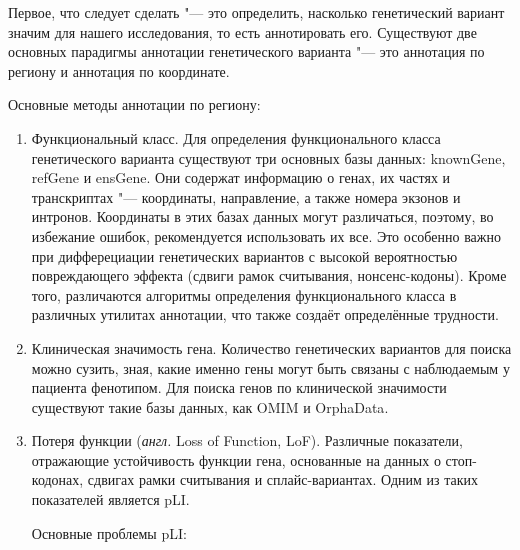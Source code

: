 \documentclass[a4paper,12pt]{article}
\begin{document}
Первое, что следует сделать "--- это определить, насколько генетический вариант значим для нашего исследования, то есть аннотировать его.
Существуют две основных парадигмы аннотации генетического варианта "--- это аннотация по региону и аннотация по координате.

Основные методы аннотации по региону:

\begin{enumerate}
\item Функциональный класс.
Для определения функционального класса генетического варианта существуют три основных базы данных: knownGene, refGene и ensGene.
Они содержат информацию о генах, их частях и транскриптах "--- координаты, направление, а также номера экзонов и интронов.
Координаты в этих базах данных могут различаться\cite{McCarthy_2014}, поэтому, во избежание ошибок, рекомендуется использовать их все.
Это особенно важно при дифферециации генетических вариантов с высокой вероятностью повреждающего эффекта (сдвиги рамок считывания, нонсенс-кодоны).
Кроме того, различаются алгоритмы определения функционального класса в различных утилитах аннотации, что также создаёт определённые трудности\cite{Jesaitis_2014}.

\item Клиническая значимость гена.
Количество генетических вариантов для поиска можно сузить, зная, какие именно гены могут быть связаны с наблюдаемым у пациента фенотипом.
Для поиска генов по клинической значимости существуют такие базы данных, как OMIM\cite{Amberger_2014} и OrphaData\cite{Orphanet}.

\item Потеря функции (\textit{англ.} Loss of Function, LoF).
Различные показатели, отражающие устойчивость функции гена, основанные на данных о стоп-кодонах, сдвигах рамки считывания и сплайс-вариантах.
Одним из таких показателей является pLI.

Основные проблемы pLI\cite{Ziegler_2019}:


\end{enumerate}
\end{document}
